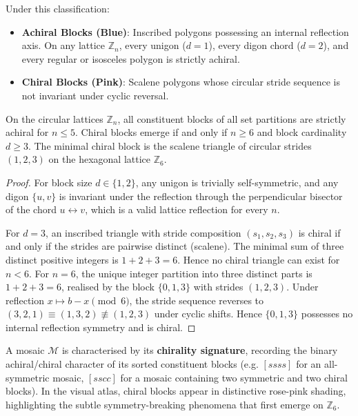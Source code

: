 Under this classification:
\begin{itemize}
    \item \textbf{Achiral Blocks (Blue)}: Inscribed polygons possessing an internal reflection axis. On any lattice $\mathbb{Z}_n$, every unigon ($d=1$), every digon chord ($d=2$), and every regular or isosceles polygon is strictly achiral.
    \item \textbf{Chiral Blocks (Pink)}: Scalene polygons whose circular stride sequence is not invariant under cyclic reversal.
\end{itemize}

\begin{theorem}
On the circular lattices $\mathbb{Z}_n$, all constituent blocks of all set partitions are strictly achiral for $n \le 5$. Chiral blocks emerge if and only if $n \ge 6$ and block cardinality $d \ge 3$. The minimal chiral block is the scalene triangle of circular strides $(1, 2, 3)$ on the hexagonal lattice $\mathbb{Z}_6$.
\end{theorem}

\begin{proof}
For block size $d \in \{1, 2\}$, any unigon is trivially self-symmetric, and any digon $\{u, v\}$ is invariant under the reflection through the perpendicular bisector of the chord $u \leftrightarrow v$, which is a valid lattice reflection for every $n$. 

For $d = 3$, an inscribed triangle with stride composition $(s_1, s_2, s_3)$ is chiral if and only if the strides are pairwise distinct (scalene). The minimal sum of three distinct positive integers is $1 + 2 + 3 = 6$. Hence no chiral triangle can exist for $n < 6$. For $n = 6$, the unique integer partition into three distinct parts is $1 + 2 + 3 = 6$, realised by the block $\{0, 1, 3\}$ with strides $(1, 2, 3)$. Under reflection $x \mapsto b - x \pmod 6$, the stride sequence reverses to $(3, 2, 1) \equiv (1, 3, 2) \not\equiv (1, 2, 3)$ under cyclic shifts. Hence $\{0, 1, 3\}$ possesses no internal reflection symmetry and is chiral.
\end{proof}

A mosaic $\mathcal{M}$ is characterised by its \textbf{chirality signature}, recording the binary achiral/chiral character of its sorted constituent blocks (e.g. $[ssss]$ for an all-symmetric mosaic, $[sscc]$ for a mosaic containing two symmetric and two chiral blocks). In the visual atlas, chiral blocks appear in distinctive rose-pink shading, highlighting the subtle symmetry-breaking phenomena that first emerge on $\mathbb{Z}_6$.

